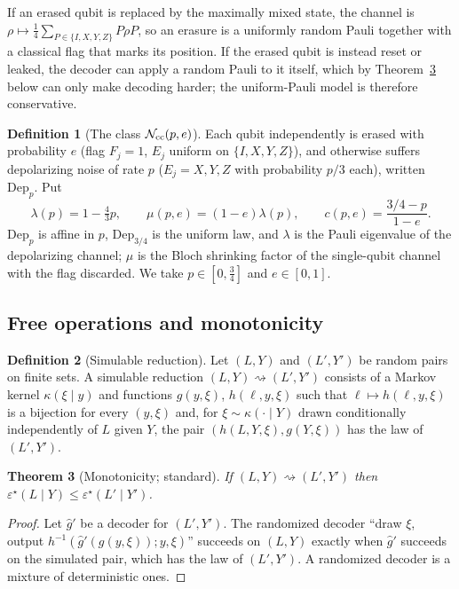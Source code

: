\documentclass[11pt,a4paper]{article}
\theoremstyle{plain}
\newtheorem{theorem}{Theorem}[section]
\theoremstyle{definition}
\newtheorem{definition}[theorem]{Definition}
\theoremstyle{remark}
\newcommand{\err}{\varepsilon^{\star}}
\newcommand{\Dep}{\mathrm{Dep}}
\newcommand{\Ncc}{\mathcal{N}_{\rm cc}}
\newcommand{\red}{\rightsquigarrow}
\begin{document}
If an erased qubit is replaced by the maximally mixed state, the channel is $\rho\mapsto\tfrac14\sum_{P\in\{I,X,Y,Z\}}P\rho P$, so an erasure is a uniformly random Pauli together with a classical flag that marks its position. If the erased qubit is instead reset or leaked, the decoder can apply a random Pauli to it itself, which by Theorem~\ref{thm:monotone} below can only make decoding harder; the uniform-Pauli model is therefore conservative.

\begin{definition}[The class $\Ncc(p,e)$]\label{def:Ncc}
Each qubit independently is erased with probability $e$ (flag $F_j=1$, $E_j$ uniform on $\{I,X,Y,Z\}$), and otherwise suffers depolarizing noise of rate $p$ ($E_j=X,Y,Z$ with probability $p/3$ each), written $\Dep_p$. Put
\[
\lambda(p)=1-\tfrac43p,\qquad \mu(p,e)=(1-e)\lambda(p),\qquad c(p,e)=\frac{3/4-p}{1-e}.
\]
$\Dep_p$ is affine in $p$, $\Dep_{3/4}$ is the uniform law, and $\lambda$ is the Pauli eigenvalue of the depolarizing channel; $\mu$ is the Bloch shrinking factor of the single-qubit channel with the flag discarded. We take $p\in[0,\tfrac34]$ and $e\in[0,1]$.
\end{definition}

\subsection{Free operations and monotonicity}

\begin{definition}[Simulable reduction]\label{def:reduction}
Let $(L,Y)$ and $(L',Y')$ be random pairs on finite sets. A simulable reduction $(L,Y)\red(L',Y')$ consists of a Markov kernel $\kappa(\xi\mid y)$ and functions $g(y,\xi)$, $h(\ell,y,\xi)$ such that $\ell\mapsto h(\ell,y,\xi)$ is a bijection for every $(y,\xi)$ and, for $\xi\sim\kappa(\cdot\mid Y)$ drawn conditionally independently of $L$ given $Y$, the pair $(h(L,Y,\xi),g(Y,\xi))$ has the law of $(L',Y')$.
\end{definition}

\begin{theorem}[Monotonicity; standard]\label{thm:monotone}
If $(L,Y)\red(L',Y')$ then $\err(L\mid Y)\le\err(L'\mid Y')$.
\end{theorem}
\begin{proof}
Let $\hat g'$ be a decoder for $(L',Y')$. The randomized decoder ``draw $\xi$, output $h^{-1}(\hat g'(g(y,\xi));y,\xi)$'' succeeds on $(L,Y)$ exactly when $\hat g'$ succeeds on the simulated pair, which has the law of $(L',Y')$. A randomized decoder is a mixture of deterministic ones.
\end{proof}
\end{document}

